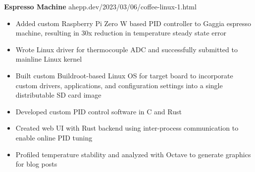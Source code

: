 \noindent \textbf{Espresso Machine} \hfill ahepp.dev/2023/03/06/coffee-linux-1.html
\begin{itemize}
    \item Added custom Raspberry Pi Zero W based PID controller to Gaggia espresso machine, resulting in 30x reduction in temperature steady state error
    \item Wrote Linux driver for thermocouple ADC and successfully submitted to mainline Linux kernel
    \item Built custom Buildroot-based Linux OS for target board to incorporate custom drivers, applications, and configuration settings into a single distributable SD card image
    \item Developed custom PID control software in C and Rust
    \item Created web UI with Rust backend using inter-process communication to enable online PID tuning
    \item Profiled temperature stability and analyzed with Octave to generate graphics for blog posts
\end{itemize}
